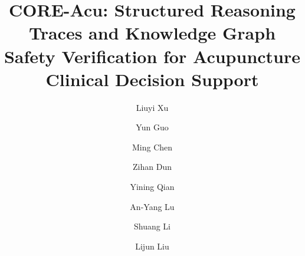 \documentclass[preprint,5p,times,twocolumn,fleqn]{elsarticle}
\begin{document}
\begin{frontmatter}



\title{CORE-Acu: Structured Reasoning Traces and Knowledge Graph Safety Verification for Acupuncture Clinical Decision Support}

\author[aff1]{Liuyi Xu}

\author[aff1]{Yun Guo}

\author[aff1]{Ming Chen}

\author[aff6]{Zihan Dun}

\author[aff5]{Yining Qian}

\author[aff1]{An-Yang Lu}

\author[aff2]{Shuang Li}

\author[aff3,aff4]{Lijun Liu}



\address[aff1]{College of Information Science and Engineering, Northeastern University, Shenyang 110819, China}

\address[aff6]{School of Information Science and Engineering, Yanshan University, Qinhuangdao, Hebei 066000, China}

\address[aff5]{School of Computer Science and Engineering, Northeastern University, Shenyang 110819, China}

\address[aff2]{School of Artificial Intelligence, Beihang University, Beijing 100000, China}

\address[aff3]{Key Laboratory of Bioresource Research and Development of Liaoning Province, Northeastern University, Shenyang 110169, China}

\address[aff4]{College of Life and Health Sciences, Northeastern University, Shenyang 110169, China}





\end{frontmatter}
\end{document}
